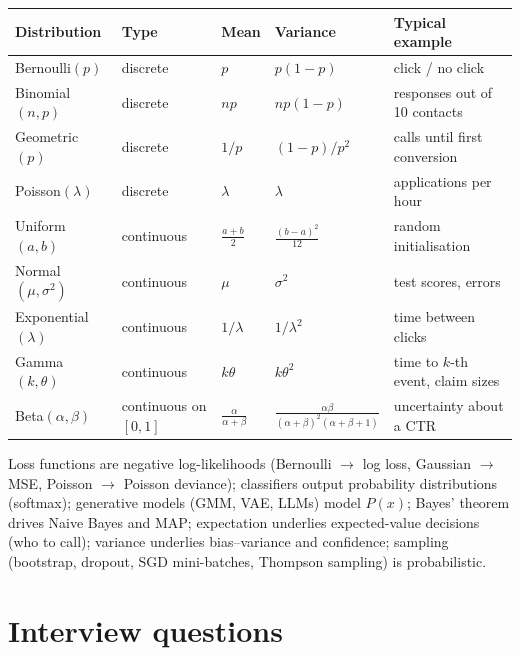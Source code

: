 \begin{center}\small
\begin{tabularx}{\linewidth}{l l l l X}
\toprule
Distribution & Type & Mean & Variance & Typical example\\
\midrule
Bernoulli$(p)$ & discrete & $p$ & $p(1-p)$ & click / no click\\
Binomial$(n,p)$ & discrete & $np$ & $np(1-p)$ & responses out of 10 contacts\\
Geometric$(p)$ & discrete & $1/p$ & $(1-p)/p^2$ & calls until first conversion\\
Poisson$(\lambda)$ & discrete & $\lambda$ & $\lambda$ & applications per hour\\
Uniform$(a,b)$ & continuous & $\frac{a+b}{2}$ & $\frac{(b-a)^2}{12}$ & random initialisation\\
Normal$(\mu,\sigma^2)$ & continuous & $\mu$ & $\sigma^2$ & test scores, errors\\
Exponential$(\lambda)$ & continuous & $1/\lambda$ & $1/\lambda^2$ & time between clicks\\
Gamma$(k,\theta)$ & continuous & $k\theta$ & $k\theta^2$ & time to $k$-th event, claim sizes\\
Beta$(\alpha,\beta)$ & continuous on $[0,1]$ & $\frac{\alpha}{\alpha+\beta}$ & $\frac{\alpha\beta}{(\alpha+\beta)^2(\alpha+\beta+1)}$ & uncertainty about a CTR\\
\bottomrule
\end{tabularx}
\end{center}

\begin{practical}
Loss functions are negative log-likelihoods (Bernoulli $\to$ log loss, Gaussian $\to$ MSE, Poisson $\to$ Poisson deviance); classifiers output probability distributions (softmax);
generative models (GMM, VAE, LLMs) model $P(x)$; Bayes' theorem drives Naive Bayes and MAP; expectation underlies expected-value decisions (who to call); variance underlies
bias--variance and confidence; sampling (bootstrap, dropout, SGD mini-batches, Thompson sampling) is probabilistic.
\end{practical}

\section{Interview questions}

